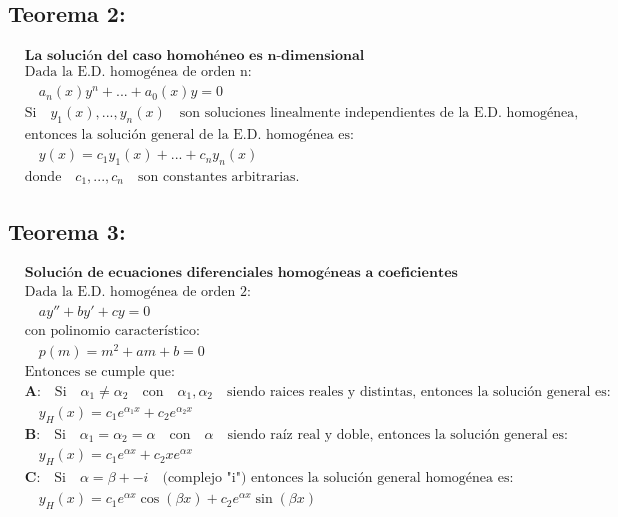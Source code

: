 \documentclass[a4paper,12pt,numbers=noenddot]{scrreprt}
\begin{document}
\subsection*{Teorema 2:}
\begin{align*}
    &\textbf{La solución del caso homohéneo es n-dimensional}\\
    &\text{Dada la E.D. homogénea de orden n:}\\
    &\quad a_n(x)y^{n}+...+a_0(x)y = 0\\
    &\text{Si} \quad y_1(x),...,y_n(x) \quad \text{son soluciones linealmente independientes de la E.D. homogénea,}\\
    &\text{entonces la solución general de la E.D. homogénea es:}\\
    &\quad y(x) = c_1y_1(x)+...+c_ny_n(x)\\
    &\text{donde} \quad c_1,...,c_n \quad \text{son constantes arbitrarias.}
\end{align*}

\subsection*{Teorema 3:}
\begin{align*}
    &\textbf{Solución de ecuaciones diferenciales homogéneas a coeficientes constantes}\\
    &\text{Dada la E.D. homogénea de orden 2:}\\
    &\quad a y'' + b y' + c y = 0\\
    &\text{con polinomio característico:}\\
    &\quad p(m) = m^2 + am + b = 0\\
    &\text{Entonces se cumple que:}\\
    &\textbf{A:} \quad \text{Si} \quad \alpha_1 \not = \alpha_2 \quad \text{con} \quad \alpha_1, \alpha_2 \quad \text{siendo raices reales y distintas,  entonces la solución general es:}\\
    &\quad y_H(x) = c_1e^{\alpha_1 x} + c_2e^{\alpha_2 x}\\
    &\textbf{B:} \quad \text{Si} \quad \alpha_1 = \alpha_2 = \alpha \quad \text{con} \quad \alpha \quad \text{siendo raíz real y doble, entonces la solución general es:}\\
    &\quad y_H(x) = c_1e^{\alpha x} + c_2xe^{\alpha x}\\
    &\textbf{C:} \quad \text{Si} \quad \alpha = \beta +- i \quad \text{(complejo "i") entonces la solución general homogénea es:}\\
    &\quad y_H(x) = c_1 e^{\alpha x} \cos (\beta x) + c_2 e^{\alpha x} \sin (\beta x)
\end{align*}
\end{document}
